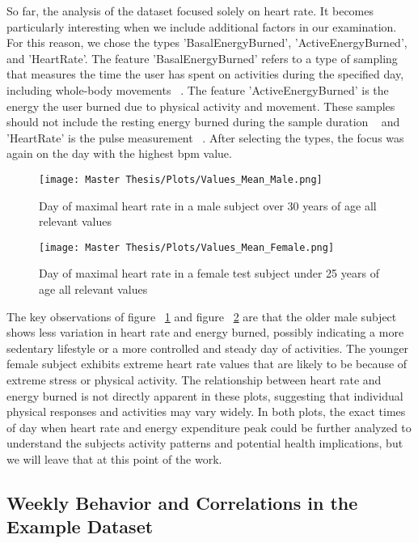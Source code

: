 So far, the analysis of the dataset focused solely on heart rate. It becomes particularly interesting when we include additional factors in our examination. For this reason, we chose the types 'BasalEnergyBurned', 'ActiveEnergyBurned', and 'HeartRate'. The feature 'BasalEnergyBurned' refers to a type of sampling that measures the time the user has spent on activities during the specified day, including whole-body movements ~\cite{appleBasalEnergyBurnedApple}.
The feature 'ActiveEnergyBurned' is the energy the user burned due to physical activity and movement. These samples should not include the resting energy burned during the sample duration ~\cite{appleActiveEnergyBurnedApple} and 'HeartRate' is the pulse measurement ~\cite{appleHeartRateApple}. After selecting the types, the focus was again on the day with the highest bpm value.

\FloatBarrier
\begin{figure}[h!]
  \centering
    \texttt{[image: Master Thesis/Plots/Values\_Mean\_Male.png]}
    \caption{Day of maximal heart rate in a male subject over 30 years of age all relevant values}
    \label{fig:ValuesMale}
    \end{figure}
\FloatBarrier

\FloatBarrier
\begin{figure}[h!]
  \centering
    \texttt{[image: Master Thesis/Plots/Values\_Mean\_Female.png]}
    \caption{Day of maximal heart rate in a female test subject under 25 years of age all relevant values}
    \label{fig:ValuesFemale}
\end{figure}
\FloatBarrier

The key observations of figure ~\ref{fig:ValuesMale} and figure ~\ref{fig:ValuesFemale} are that the older male subject shows less variation in heart rate and energy burned, possibly indicating a more sedentary lifestyle or a more controlled and steady day of activities.
The younger female subject exhibits extreme heart rate values that are likely to be because of extreme stress or physical activity.
The relationship between heart rate and energy burned is not directly apparent in these plots, suggesting that individual physical responses and activities may vary widely.
In both plots, the exact times of day when heart rate and energy expenditure peak could be further analyzed to understand the subjects activity patterns and potential health implications, but we will leave that at this point of the work.

\subsection{Weekly Behavior and Correlations in the Example Dataset}

